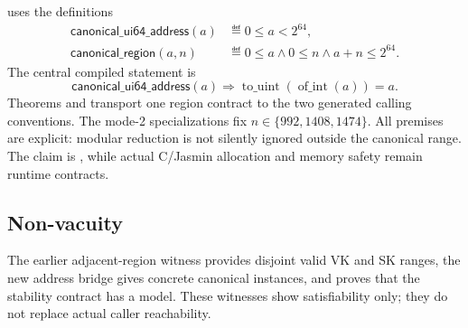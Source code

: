  uses the definitions
\[
\begin{aligned}
  \mathsf{canonical\_ui64\_address}(a)
    &\eqdef 0 \leq a < 2^{64}, \\
  \mathsf{canonical\_region}(a,n)
    &\eqdef 0 \leq a \land 0 \leq n \land a+n \leq 2^{64}.
\end{aligned}
\]
The central compiled statement is
\[
  \mathsf{canonical\_ui64\_address}(a)
  \Longrightarrow
  \operatorname{to\_uint}(\operatorname{of\_int}(a))=a.
\]
Theorems
 and
 transport one region contract
to the two generated calling conventions.  The mode-2 specializations fix
$n\in\{992,1408,1474\}$.  All premises are explicit: modular reduction is not
silently ignored outside the canonical range.  The claim is ,
while actual C/Jasmin allocation and memory safety remain runtime contracts.

\subsection{Non-vacuity}

The earlier adjacent-region witness provides disjoint valid VK and SK ranges,
the new address bridge gives concrete canonical instances, and
 proves that the stability contract has a
model.  These witnesses show satisfiability only; they do not replace actual
caller reachability.
